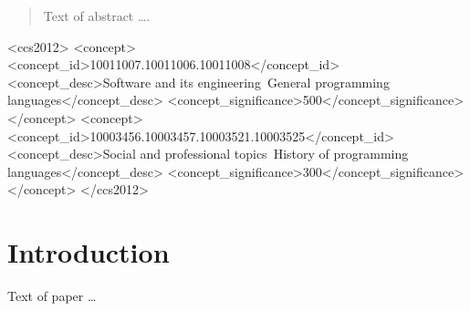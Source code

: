 \documentclass[sigplan,review,anonymous]{acmart}\settopmatter{printfolios=true,printccs=false,printacmref=false}
\begin{document}
\begin{abstract}
Text of abstract \ldots.
\end{abstract}


\begin{CCSXML}
<ccs2012>
<concept>
<concept_id>10011007.10011006.10011008</concept_id>
<concept_desc>Software and its engineering~General programming languages</concept_desc>
<concept_significance>500</concept_significance>
</concept>
<concept>
<concept_id>10003456.10003457.10003521.10003525</concept_id>
<concept_desc>Social and professional topics~History of programming languages</concept_desc>
<concept_significance>300</concept_significance>
</concept>
</ccs2012>
\end{CCSXML}





\maketitle


\section{Introduction}

Text of paper \ldots
\end{document}
